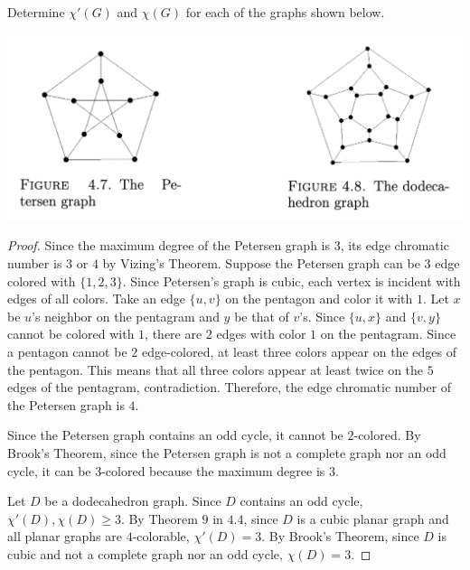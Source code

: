 \documentclass{article}
\newenvironment{problem}[2][Problem]{\begin{trivlist}
\item[\hskip \labelsep {\bfseries #1}\hskip \labelsep {\bfseries #2.}]}{\end{trivlist}}
\begin{document}
\begin{problem}{4.7.2}
    Determine $\chi{'}(G)$ and $\chi(G)$ for each of the graphs shown below.
    
    \includegraphics[width=.93\textwidth]{Q472}
\end{problem}

\begin{proof}
    Since the maximum degree of the Petersen graph is $3$, its edge chromatic number is $3$ or $4$ by Vizing's Theorem. Suppose the Petersen graph can be $3$ edge colored with $\{1, 2, 3\}$. Since Petersen's graph is cubic, each vertex is incident with edges of all colors. Take an edge $\{u, v\}$ on the pentagon and color it with $1$. Let $x$ be $u$'s neighbor on the pentagram and $y$ be that of $v$'s. Since $\{u, x\}$ and $\{v, y\}$ cannot be colored with $1$, there are $2$ edges with color $1$ on the pentagram. Since a pentagon cannot be $2$ edge-colored, at least three colors appear on the edges of the pentagon. This means that all three colors appear at least twice on the $5$ edges of the pentagram, contradiction. Therefore, the edge chromatic number of the Petersen graph is $4$. 

    Since the Petersen graph contains an odd cycle, it cannot be $2$-colored. By Brook's Theorem, since the Petersen graph is not a complete graph nor an odd cycle, it can be $3$-colored because the maximum degree is $3$.

    Let $D$ be a dodecahedron graph. Since $D$ contains an odd cycle, $\chi{'}(D), \chi(D) \geq 3$. By Theorem $9$ in $4.4$, since $D$ is a cubic planar graph and all planar graphs are $4$-colorable, $\chi{'}(D) = 3$. By Brook's Theorem, since $D$ is cubic and not a complete graph nor an odd cycle, $\chi(D) = 3$.
\end{proof}
\end{document}
